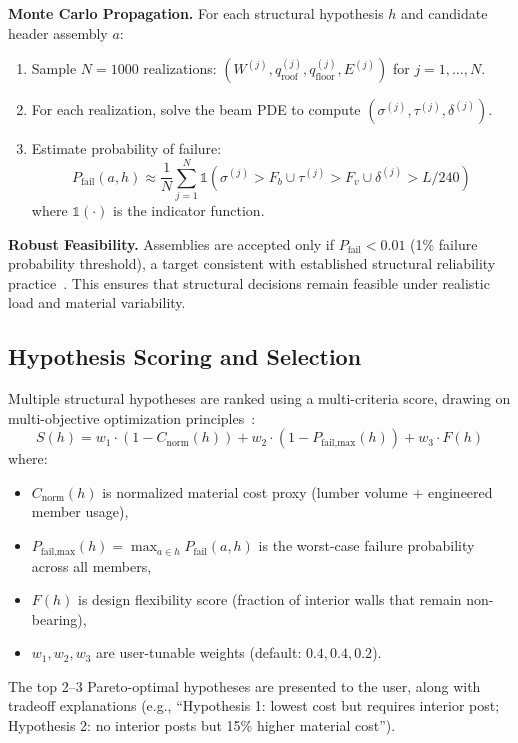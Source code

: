 \textbf{Monte Carlo Propagation.}
For each structural hypothesis $h$ and candidate header assembly $a$:
\begin{enumerate}
  \item Sample $N = 1000$ realizations: $(W^{(j)}, q_{\text{roof}}^{(j)}, q_{\text{floor}}^{(j)}, E^{(j)})$ for $j = 1, \ldots, N$.
  \item For each realization, solve the beam PDE to compute $(\sigma^{(j)}, \tau^{(j)}, \delta^{(j)})$.
  \item Estimate probability of failure:
  \[
  P_{\text{fail}}(a, h) \approx \frac{1}{N} \sum_{j=1}^{N} \mathbb{1}\left(\sigma^{(j)} > F_b \cup \tau^{(j)} > F_v \cup \delta^{(j)} > L/240\right)
  \]
  where $\mathbb{1}(\cdot)$ is the indicator function.
\end{enumerate}

\textbf{Robust Feasibility.}
Assemblies are accepted only if $P_{\text{fail}} < 0.01$ (1\% failure probability threshold), a target consistent with established structural reliability practice~\cite{melchers_beck_2018}.
This ensures that structural decisions remain feasible under realistic load and material variability.

\subsection{Hypothesis Scoring and Selection}

Multiple structural hypotheses are ranked using a multi-criteria score, drawing on multi-objective optimization principles~\cite{deb_moo_2001}:
\[
S(h) = w_1 \cdot (1 - C_{\text{norm}}(h)) + w_2 \cdot (1 - P_{\text{fail,max}}(h)) + w_3 \cdot F(h)
\]
where:
\begin{itemize}
  \item $C_{\text{norm}}(h)$ is normalized material cost proxy (lumber volume + engineered member usage),
  \item $P_{\text{fail,max}}(h) = \max_{a \in h} P_{\text{fail}}(a, h)$ is the worst-case failure probability across all members,
  \item $F(h)$ is design flexibility score (fraction of interior walls that remain non-bearing),
  \item $w_1, w_2, w_3$ are user-tunable weights (default: $0.4, 0.4, 0.2$).
\end{itemize}

The top 2--3 Pareto-optimal hypotheses are presented to the user, along with tradeoff explanations (e.g., ``Hypothesis 1: lowest cost but requires interior post; Hypothesis 2: no interior posts but 15\% higher material cost'').

